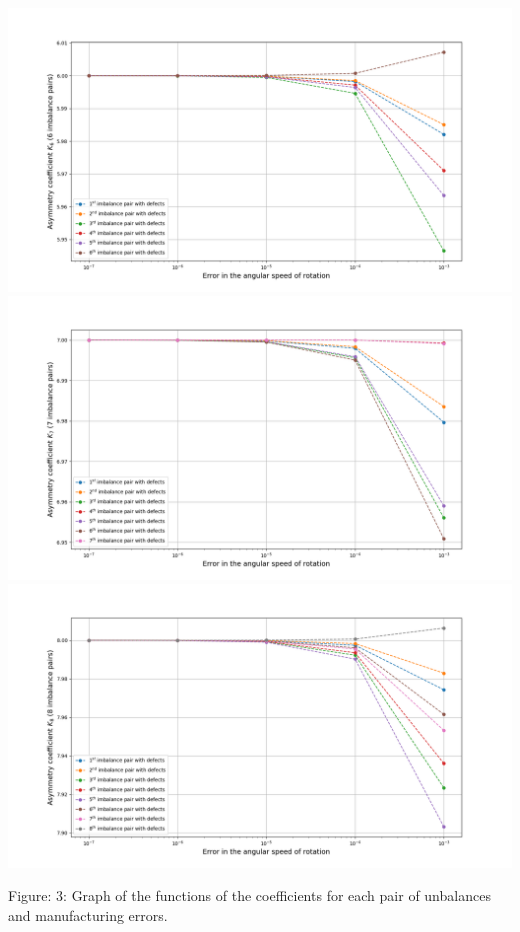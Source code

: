 \documentclass[
11pt,%
tightenlines,%
twoside,%
onecolumn,%
nofloats,%
nobibnotes,%
nofootinbib,%
superscriptaddress,%
noshowpacs,%
centertags]%
{revtex4}
\begin{document}
\begin{center}
\includegraphics[max width=\textwidth]{6.png}
\includegraphics[max width=\textwidth]{7.png}
\includegraphics[max width=\textwidth]{8.png}
\end{center}


Figure: 3: Graph of the functions of the coefficients for each pair of unbalances and manufacturing errors.

\end{document}
